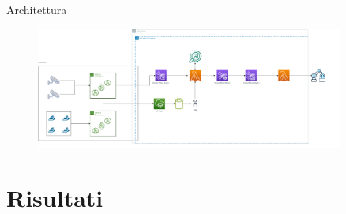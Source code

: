 \documentclass{beamer}
\begin{document}
\begin{frame}{Architettura}
\begin{figure}
    \centering
    \includegraphics[width=0.9\textwidth]{images/architettura.png}
\end{figure}
\end{frame}






\section{Risultati}
\end{document}
